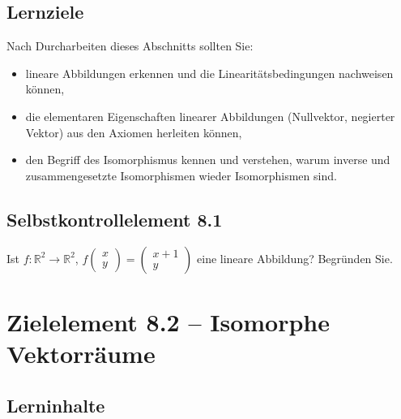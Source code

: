 \documentclass[a4paper,12pt]{article}
\begin{document}
\subsection*{Lernziele}

Nach Durcharbeiten dieses Abschnitts sollten Sie:
\begin{itemize}
  \item lineare Abbildungen erkennen und die Linearitätsbedingungen nachweisen
        können,
  \item die elementaren Eigenschaften linearer Abbildungen (Nullvektor, negierter Vektor)
        aus den Axiomen herleiten können,
  \item den Begriff des Isomorphismus kennen und verstehen, warum inverse und
        zusammengesetzte Isomorphismen wieder Isomorphismen sind.
\end{itemize}

\subsection*{Selbstkontrollelement 8.1}

Ist $f: \mathbb{R}^2 \to \mathbb{R}^2$, $f\!\begin{pmatrix}x\\y\end{pmatrix} = \begin{pmatrix}x+1\\y\end{pmatrix}$
eine lineare Abbildung? Begründen Sie.

\newpage

\section*{Zielelement 8.2 -- Isomorphe Vektorräume}

\subsection*{Lerninhalte}

\begin{center}
\end{center}
\end{document}
